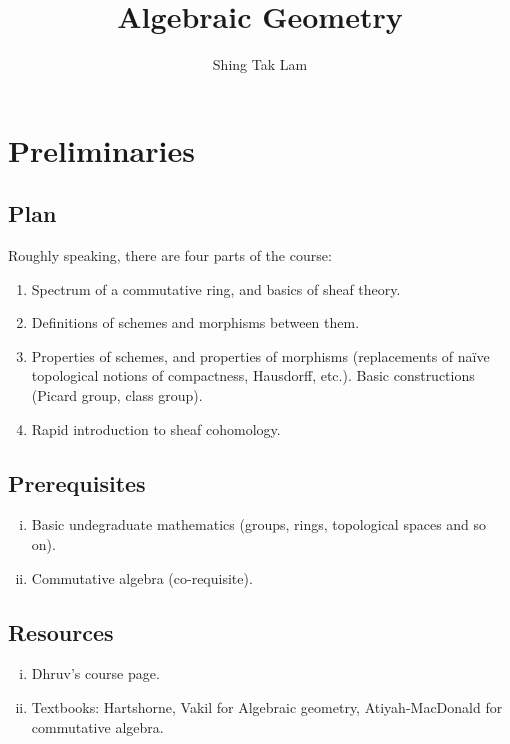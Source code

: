 \documentclass{article}
\title{Algebraic Geometry}
\author{Shing Tak Lam}
\begin{document}
\maketitle

\lec

\section*{Preliminaries}

\subsection*{Plan}

Roughly speaking, there are four parts of the course:

\begin{enumerate}
    \item Spectrum of a commutative ring, and basics of sheaf theory.
    \item Definitions of schemes and morphisms between them.
    \item Properties of schemes, and properties of morphisms (replacements of na\"ive topological notions of compactness, Hausdorff, etc.). Basic constructions (Picard group, class group).
    \item Rapid introduction to sheaf cohomology.
\end{enumerate}

\subsection*{Prerequisites}

\begin{enumerate}[(i)]
    \item Basic undegraduate mathematics (groups, rings, topological spaces and so on).
    \item Commutative algebra (co-requisite).
\end{enumerate}

\subsection*{Resources}

\begin{enumerate}[(i)]
    \item Dhruv's course page.
    \item Textbooks: Hartshorne, Vakil for Algebraic geometry, Atiyah-MacDonald for commutative algebra.
\end{enumerate}
\end{document}
